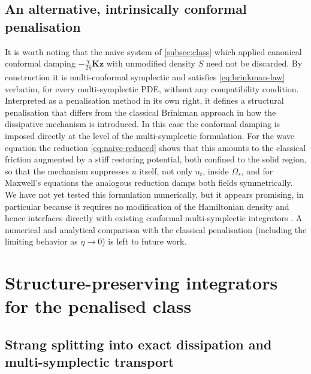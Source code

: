 \documentclass[11pt]{article}
\theoremstyle{definition}
\theoremstyle{remark}
\newcommand{\bz}{\bm{z}}
\newcommand{\bK}{\bm{K}}
\begin{document}
\subsection{An alternative, intrinsically conformal penalisation}
\label{subsec:alternative}

It is worth noting that the naive system of \cref{subsec:class} which applied canonical conformal damping
$-\frac{\chi}{2\eta}\bK\bz$ with unmodified density $S$ need
not be discarded. By construction it is multi-conformal symplectic and
satisfies \eqref{eq:brinkman-law} verbatim, for every multi-symplectic
PDE, without any compatibility condition.  Interpreted as a
penalisation method in its own right, it defines a structural
penalisation that differs from the classical Brinkman approach in how
the dissipative mechanism is introduced. In this case the conformal damping is imposed directly at the level of the multi-symplectic formulation.
For the wave equation the reduction \eqref{eq:naive-reduced} shows
that this amounts to the classical friction augmented by a stiff
restoring potential, both confined to the solid region, so that the
mechanism suppresses $u$ itself, not only $u_t$, inside $\Omega_s$, and for Maxwell's equations the analogous reduction damps both fields
symmetrically.  We have not yet tested this formulation numerically,
but it appears promising, in particular because it requires no
modification of the Hamiltonian density and hence interfaces directly
with existing conformal multi-symplectic integrators
\cite{bhatt2016conformal}. A numerical and analytical comparison with
the classical penalisation (including the limiting behavior as
$\eta\to0$) is left to future work.
\fi
\section{Structure-preserving integrators for the penalised class}
\label{sec:integrators}

\subsection{Strang splitting into exact dissipation and
multi-symplectic transport}
\label{subsec:splitting}
\end{document}
